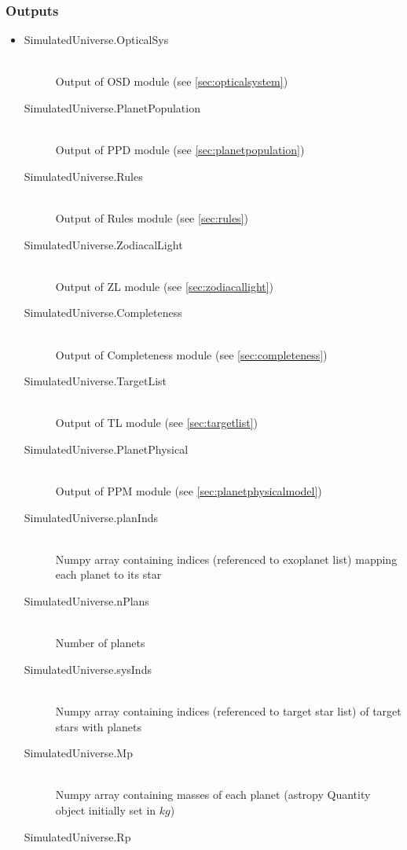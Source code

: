 \documentclass[cleanfoot]{asme2ej}
\begin{document}
\subsubsection*{Outputs}
\begin{itemize}
    \item
    \begin{description}
        \item[SimulatedUniverse.OpticalSys] \hfill \\
        Output of OSD module (see \ref{sec:opticalsystem})
        \item[SimulatedUniverse.PlanetPopulation] \hfill \\
        Output of PPD module (see \ref{sec:planetpopulation})
        \item[SimulatedUniverse.Rules] \hfill \\
        Output of Rules module (see \ref{sec:rules})
        \item[SimulatedUniverse.ZodiacalLight] \hfill \\
        Output of ZL module (see \ref{sec:zodiacallight})
        \item[SimulatedUniverse.Completeness] \hfill \\
        Output of Completeness module (see \ref{sec:completeness})
        \item[SimulatedUniverse.TargetList] \hfill \\
        Output of TL module (see \ref{sec:targetlist})
        \item[SimulatedUniverse.PlanetPhysical] \hfill \\
        Output of PPM module (see \ref{sec:planetphysicalmodel})
        \item[SimulatedUniverse.planInds] \hfill \\
        Numpy array containing indices (referenced to exoplanet list) mapping each planet to its star
        \item[SimulatedUniverse.nPlans] \hfill \\
        Number of planets
        \item[SimulatedUniverse.sysInds] \hfill \\
        Numpy array containing indices (referenced to target star list) of target stars with planets
        \item[SimulatedUniverse.Mp] \hfill \\
        Numpy array containing masses of each planet (astropy Quantity object initially set in $ kg $)
        \item[SimulatedUniverse.Rp] \hfill \\

\end{description}
\end{itemize}
\end{document}
